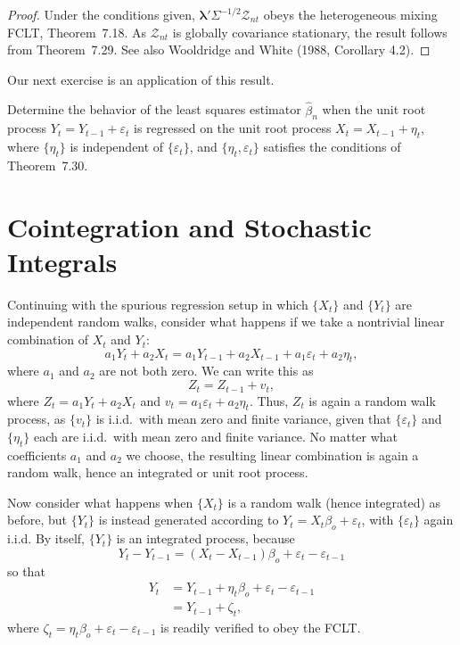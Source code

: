 \begin{proof}
Under the conditions given, $\boldsymbol{\lambda}'\Sigma^{-1/2}\boldsymbol{\mathcal{Z}}_{nt}$ obeys the heterogeneous mixing FCLT, Theorem~7.18. As $\boldsymbol{\mathcal{Z}}_{nt}$ is globally covariance stationary, the result follows from Theorem~7.29. See also Wooldridge and White (1988, Corollary 4.2).
\end{proof}

Our next exercise is an application of this result.

\begin{exercises}
\item\label{ex:7.31} Determine the behavior of the least squares estimator $\hat{\beta}_n$ when the unit root process $Y_t = Y_{t-1} + \varepsilon_t$ is regressed on the unit root process $X_t = X_{t-1} + \eta_t$, where $\{\eta_t\}$ is independent of $\{\varepsilon_t\}$, and $\{\eta_t, \varepsilon_t\}$ satisfies the conditions of Theorem~7.30.
\end{exercises}

\section{Cointegration and Stochastic Integrals}\label{sec:cointegration}

Continuing with the spurious regression setup in which $\{X_t\}$ and $\{Y_t\}$ are independent random walks, consider what happens if we take a nontrivial linear combination of $X_t$ and $Y_t$:
\[
a_1 Y_t + a_2 X_t = a_1 Y_{t-1} + a_2 X_{t-1} + a_1 \varepsilon_t + a_2 \eta_t,
\]
where $a_1$ and $a_2$ are not both zero. We can write this as
\[
Z_t = Z_{t-1} + v_t,
\]
where $Z_t = a_1 Y_t + a_2 X_t$ and $v_t = a_1 \varepsilon_t + a_2 \eta_t$. Thus, $Z_t$ is again a random walk process, as $\{v_t\}$ is i.i.d.\ with mean zero and finite variance, given that $\{\varepsilon_t\}$ and $\{\eta_t\}$ each are i.i.d.\ with mean zero and finite variance. No matter what coefficients $a_1$ and $a_2$ we choose, the resulting linear combination is again a random walk, hence an integrated or unit root process.

Now consider what happens when $\{X_t\}$ is a random walk (hence integrated) as before, but $\{Y_t\}$ is instead generated according to $Y_t = X_t \beta_o + \varepsilon_t$, with $\{\varepsilon_t\}$ again i.i.d. By itself, $\{Y_t\}$ is an integrated process, because
\[
Y_t - Y_{t-1} = (X_t - X_{t-1})\beta_o + \varepsilon_t - \varepsilon_{t-1}
\]
so that
\begin{align*}
Y_t &= Y_{t-1} + \eta_t \beta_o + \varepsilon_t - \varepsilon_{t-1} \\
&= Y_{t-1} + \zeta_t,
\end{align*}
where $\zeta_t = \eta_t \beta_o + \varepsilon_t - \varepsilon_{t-1}$ is readily verified to obey the FCLT.

